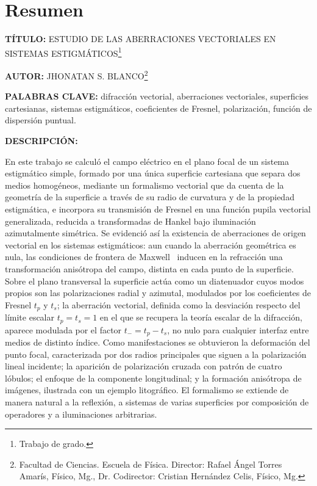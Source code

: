 \clearpage
\chapter*{Resumen}

\noindent\textbf{TÍTULO:} ESTUDIO DE LAS ABERRACIONES VECTORIALES EN SISTEMAS
ESTIGMÁTICOS\footnote{Trabajo de grado.}

\vspace{0.5em}
\noindent\textbf{AUTOR:} JHONATAN S. BLANCO\footnote{Facultad de Ciencias.
Escuela de Física. Director: Rafael Ángel Torres Amarís, Físico, Mg., Dr.
Codirector: Cristian Hernández Celis, Físico, Mg.}

\vspace{0.5em}
\noindent\textbf{PALABRAS CLAVE:} difracción vectorial, aberraciones
vectoriales, superficies cartesianas, sistemas estigmáticos, coeficientes de
Fresnel, polarización, función de dispersión puntual.

\vspace{0.5em}
\noindent\textbf{DESCRIPCIÓN:}

En este trabajo se calculó el campo eléctrico en el plano focal de un sistema
estigmático simple, formado por una única superficie cartesiana que separa
dos medios homogéneos, mediante un formalismo vectorial que da cuenta de la
geometría de la superficie a través de su radio de curvatura y de la
propiedad estigmática, e incorpora su transmisión de Fresnel en una función
pupila vectorial generalizada, reducida a transformadas de Hankel bajo
iluminación azimutalmente simétrica. Se evidenció así la existencia de
aberraciones de origen vectorial en los sistemas estigmáticos: aun cuando la
aberración geométrica es nula, las condiciones de frontera de Maxwell~\cite{jackson1999} inducen
en la refracción una transformación anisótropa del campo, distinta en cada
punto de la superficie. Sobre el plano transversal la superficie actúa como
un diatenuador cuyos modos propios son las polarizaciones radial y azimutal,
modulados por los coeficientes de Fresnel $t_p$ y $t_s$; la aberración
vectorial, definida como la desviación respecto del límite escalar
$t_p=t_s=1$ en el que se recupera la teoría escalar de la difracción, aparece
modulada por el factor $t_-=t_p-t_s$, no nulo para cualquier interfaz entre
medios de distinto índice. Como manifestaciones se obtuvieron la deformación
del punto focal, caracterizada por dos radios principales que siguen a la
polarización lineal incidente; la aparición de polarización cruzada con
patrón de cuatro lóbulos; el enfoque de la componente longitudinal; y la
formación anisótropa de imágenes, ilustrada con un ejemplo litográfico. El
formalismo se extiende de manera natural a la reflexión, a sistemas de varias
superficies por composición de operadores y a iluminaciones arbitrarias.

